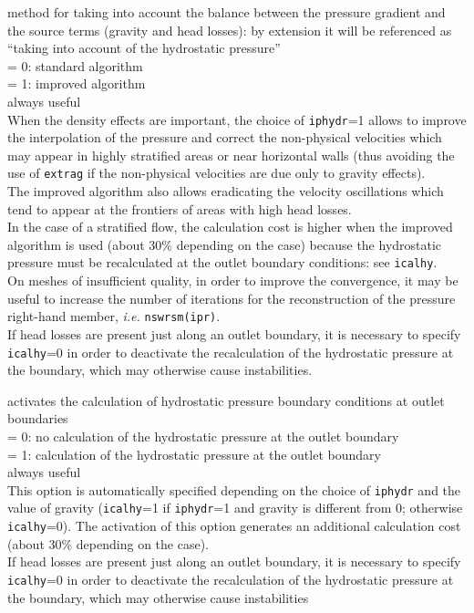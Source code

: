 {method for taking into account the balance between the pressure gradient and
the source terms (gravity and head losses): by extension it will be
referenced as ``taking into account of the hydrostatic pressure''\\
\hspace*{1.3cm}= 0: standard algorithm\\
\hspace*{1.3cm}= 1: improved algorithm\\
always useful\\
When the density effects are important, the choice of
{\tt iphydr}=1 allows to improve the interpolation of the pressure and correct the
non-physical velocities which may appear in highly
stratified areas or near horizontal walls (thus
avoiding the use of {\tt extrag} if the non-physical velocities are due only to
gravity effects).\\
The improved algorithm also allows eradicating the velocity oscillations
which tend to appear at the frontiers of areas with high head losses.\\
In the case of a stratified flow, the calculation cost is higher when the
improved algorithm is used (about 30\% depending on the case) because
the hydrostatic pressure must be recalculated at the outlet boundary
conditions: see {\tt icalhy}.\\
On meshes of insufficient quality, in order to
improve the convergence, it may be useful to increase the number of
iterations for the reconstruction of the pressure right-hand member,
{\em i.e.} \mbox{\tt nswrsm(ipr)}.\\
If head losses are present just along an outlet boundary, it is necessary to
specify {\tt icalhy}=0 in order to deactivate the recalculation of the hydrostatic
pressure at the boundary, which may otherwise cause instabilities.}

{activates the calculation of hydrostatic pressure boundary conditions at outlet
boundaries\\
\hspace*{1.3cm}= 0: no calculation of the hydrostatic pressure at the outlet boundary\\
\hspace*{1.3cm}= 1: calculation of the hydrostatic pressure at the outlet boundary\\
always useful\\
This option is automatically specified depending on the
choice of {\tt iphydr} and the value of gravity
({\tt icalhy}=1 if {\tt iphydr}=1 and gravity is different from 0; otherwise
{\tt icalhy}=0). The activation of this option generates an additional
calculation cost (about 30\% depending on the case).\\
If head losses are present just along an outlet boundary, it is necessary to
specify {\tt icalhy}=0 in order to deactivate the recalculation of the hydrostatic
pressure at the boundary, which may otherwise cause instabilities}

